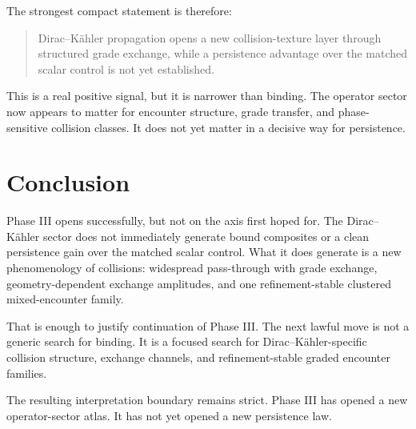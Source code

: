 \documentclass[11pt]{article}
\begin{document}
The strongest compact statement is therefore:
\begin{quote}
Dirac--K\"ahler propagation opens a new collision-texture layer through structured grade exchange, while a persistence advantage over the matched scalar control is not yet established.
\end{quote}

This is a real positive signal, but it is narrower than binding. The operator sector now appears to matter for encounter structure, grade transfer, and phase-sensitive collision classes. It does not yet matter in a decisive way for persistence.

\section{Conclusion}

Phase III opens successfully, but not on the axis first hoped for. The Dirac--K\"ahler sector does not immediately generate bound composites or a clean persistence gain over the matched scalar control. What it does generate is a new phenomenology of collisions: widespread pass-through with grade exchange, geometry-dependent exchange amplitudes, and one refinement-stable clustered mixed-encounter family.

That is enough to justify continuation of Phase III. The next lawful move is not a generic search for binding. It is a focused search for Dirac--K\"ahler-specific collision structure, exchange channels, and refinement-stable graded encounter families.

The resulting interpretation boundary remains strict. Phase III has opened a new operator-sector atlas. It has not yet opened a new persistence law.
\end{document}

